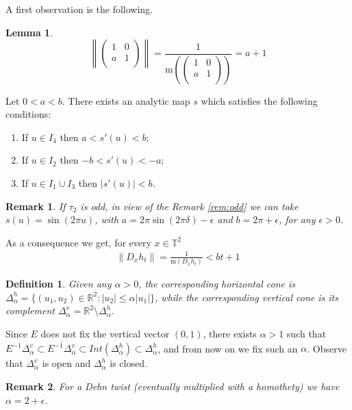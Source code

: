 \documentclass[11pt,letterpaper,reqno]{article}
\newtheorem{lemma}{Lemma}[section]
\newtheorem{definition}{Definition}[section]
\newtheorem{remark}{Remark}[section]
\newcommand{\conorm}[1]{\mathrm{m}\left(#1\right)}
\newcommand{\Real}{\mathbb R}
\newcommand{\Tor}{\mathbb{T}^2}
\newcommand{\Deh}{\Delta_{\alpha}^h}
\newcommand{\Dev}{\Delta_{\alpha}^v}
\begin{document}
A first observation is the following.

\begin{lemma}
\[
\left\|\begin{pmatrix}
1 & 0\\
a & 1\\
\end{pmatrix}\right\|=\frac 1{\conorm{\begin{pmatrix}
1 & 0\\
a & 1\\
\end{pmatrix}}}=a+1
\]
\end{lemma}
\color{black}


Let $0<a<b$. There exists an analytic map $s$ which satisfies the following conditions: 
\begin{enumerate}
\item
If $u\in I_4$ then $a<s'(u)<b$;
\item
If $u\in I_2$ then $-b<s'(u)<-a$;
\item
If $u\in I_1\cup I_3$ then $|s'(u)|<b$.
\end{enumerate}

\begin{remark}
If $\tau_2$ is odd, in view of the Remark \ref{rem:odd} we can take $s(u)=\sin(2\pi u)$, with $a=2\pi\sin(2\pi\delta)-\epsilon$ and $b=2\pi+\epsilon$, for any $\epsilon>0$.
\end{remark} 

As a consequence we get, for every $x\in \Tor$
\begin{align}\label{eq:normaht}
	 \|D_xh_t\|=\frac 1{\conorm{D_xh_t}}<bt+1
\end{align}


 \begin{definition}
Given any $\alpha>0$, the corresponding horizontal cone is $\Deh=\{(u_1,u_2)\in\Real^2: |u_2|\leq \alpha|u_1|\}$, while the corresponding vertical cone is its complement $\Dev=\Real^2\setminus\Deh$.
\end{definition}

Since $E$ does not fix the vertical vector $(0,1)$, there exists $\alpha>1$ such that $E^{-1}\Dev\subset\overline{E^{-1}\Dev}\subset Int(\Deh)\subset\Deh$, and from now on we fix such an $\alpha$. Observe that $\Dev$ is open and $\Deh$ is closed.


\begin{remark}\label{rem:twist}
For a Dehn twist (eventually multiplied with a homothety) we have $\alpha=2+\epsilon$.
\end{remark}
\end{document}

